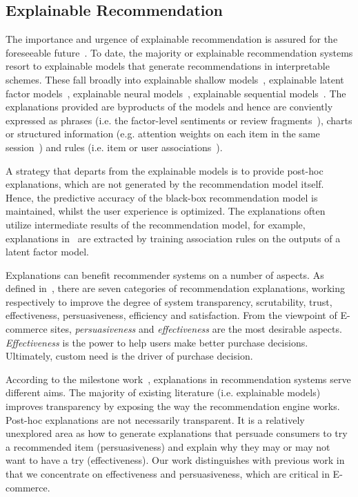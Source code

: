 \documentclass[sigconf]{acmart}
\begin{document}
\subsection{Explainable Recommendation}
The importance and urgence of explainable recommendation is assured for the foreseeable future~\cite{Zhang2018SIGIR}. To date, the majority or explainable recommendation systems resort to explainable models that generate recommendations in interpretable schemes. These fall broadly into explainable shallow models~\cite{vig2009tagsplanations,sigurbjornsson2008flickr}, explainable latent factor models~\cite{Zhang2014Explicit,Zhang2015Daily,Wu2015FLAME}, explainable neural models~\cite{Chen2018Neural}, explainable sequential models~\cite{Chen2018Sequential}. The explanations provided are byproducts of the models and hence are conviently expressed as phrases (i.e. the factor-level sentiments or review fragments~\cite{Zhang2014Explicit,Zhang2015Daily,Wu2015FLAME}), charts or structured information (e.g. attention weights on each item in the same session~\cite{Chen2018Neural}) and rules (i.e. item or user associations~\cite{vig2009tagsplanations,sigurbjornsson2008flickr}).   


A strategy that departs from the explainable models is to provide post-hoc explanations, which are not generated by the recommendation model itself. Hence, the predictive accuracy of the black-box recommendation model is maintained, whilst the user experience is optimized. The explanations often utilize intermediate results of the recommendation model, for example, explanations in~\cite{Peake2018Explanation} are extracted by training association rules on the outputs of a latent factor model.

Explanations can benefit recommender systems on a number of aspects. As defined in~\cite{Tintarev2011Designing}, there are seven categories of recommendation explanations, working respectively to improve the degree of system transparency, scrutability, trust, effectiveness, persuasiveness, efficiency and satisfaction. 
From the viewpoint of E-commerce sites, \textit{persuasiveness} and \textit{effectiveness} are the most desirable aspects. \textit{Effectiveness} is the power to help users make better purchase decisions.
Ultimately, custom need is the driver of purchase decision. 

According to the milestone work~\cite{Tintarev2011Designing}, explanations in recommendation systems serve different aims. The majority of existing literature (i.e. explainable models) improves transparency by exposing the way the recommendation engine works. Post-hoc explanations are not necessarily transparent. It is a relatively unexplored area as how to generate explanations that persuade consumers to try a recommended item (persuasiveness) and explain why they may or may not want to have a try (effectiveness). Our work distinguishes with previous work in that we concentrate on effectiveness and persuasiveness, which are critical in E-commerce. 
\end{document}
